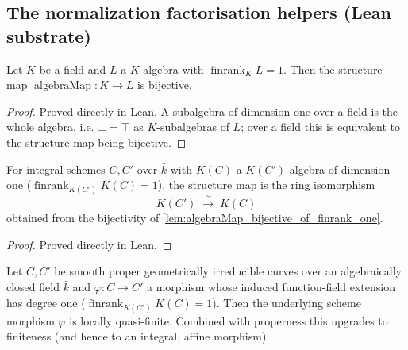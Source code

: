 \subsection{The normalization factorisation helpers (Lean substrate)}
\begin{lemma}
  \label{lem:algebraMap_bijective_of_finrank_one}
  Let \(K\) be a field and \(L\) a \(K\)-algebra with
  \(\operatorname{finrank}_K L = 1\). Then the structure map
  \(\operatorname{algebraMap} \colon K \to L\) is bijective.
\end{lemma}
\begin{proof}

\leanok
  Proved directly in Lean. A subalgebra of dimension one over a field is the
  whole algebra, i.e. \(\bot = \top\) as \(K\)-subalgebras of \(L\); over a field
  this is equivalent to the structure map being bijective.
\end{proof}
\begin{definition}
  \label{def:phi_left_functionField_algEquiv_of_finrank_one}
  For integral schemes \(C, C'\) over \(\bar k\) with \(K(C)\) a
  \(K(C')\)-algebra of dimension one
  (\(\operatorname{finrank}_{K(C')} K(C) = 1\)), the structure map is the ring
  isomorphism
  \[
    K(C') \;\xrightarrow{\ \sim\ }\; K(C)
  \]
  obtained from the bijectivity of \cref{lem:algebraMap_bijective_of_finrank_one}.
\end{definition}
\begin{proof}

\leanok
  Proved directly in Lean.
\end{proof}
\begin{lemma}
  \label{lem:phi_left_locallyQuasiFinite_of_finrank_one}
  Let \(C, C'\) be smooth proper geometrically irreducible curves over an
  algebraically closed field \(\bar k\) and \(\varphi \colon C \to C'\) a
  morphism whose induced function-field extension has degree one
  (\(\operatorname{finrank}_{K(C')} K(C) = 1\)). Then the underlying scheme
  morphism \(\varphi\) is locally quasi-finite. Combined with properness this
  upgrades to finiteness (and hence to an integral, affine morphism).
\end{lemma}

